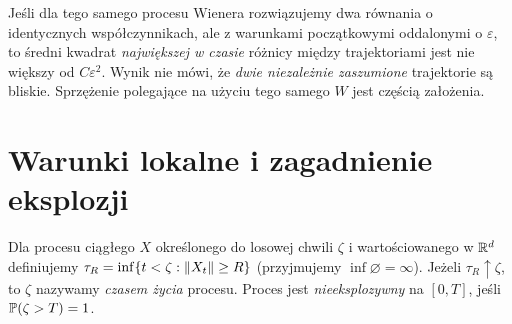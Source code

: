 \begin{przyklad}
Jeśli dla tego samego procesu Wienera rozwiązujemy
dwa równania o identycznych współczynnikach, ale
z warunkami początkowymi oddalonymi o $\varepsilon$,
to średni kwadrat \emph{największej w czasie} różnicy
między trajektoriami jest nie większy od $C\varepsilon^2$.
Wynik nie mówi, że \emph{dwie niezależnie zaszumione}
trajektorie są bliskie. Sprzężenie polegające na
użyciu tego samego $W$ jest częścią założenia.
\end{przyklad}

\section{Warunki lokalne i zagadnienie eksplozji}
\begin{definicja}
Dla procesu ciągłego $X$ określonego do losowej chwili
$\zeta$ i wartościowanego w $\mathbb{R}^d$ definiujemy
$\tau_R=\inf\{t<\zeta:\lVert X_t\rVert\ge R\}$
(przyjmujemy $\inf\varnothing=\infty$).
Jeżeli $\tau_R\uparrow\zeta$, to $\zeta$ nazywamy
\emph{czasem życia} procesu. Proces jest
\emph{nieeksplozywny} na $[0,T]$, jeśli $\mathbb{P}(\zeta>T)=1$.
\end{definicja}

